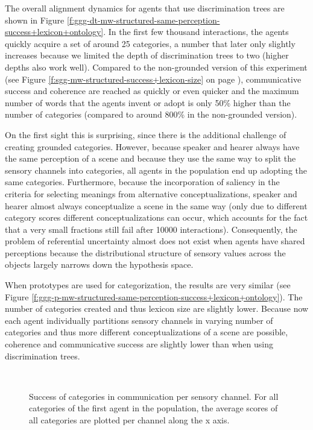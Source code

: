 The overall alignment dynamics for agents that use discrimination
trees are shown in Figure
\ref{f:ggg-dt-mw-structured-same-perception-success+lexicon+ontology}. In
the first few thousand interactions, the agents quickly acquire a set
of around 25 categories, a number that later only slightly increases
because we limited the depth of discrimination trees to two (higher
depths also work well). Compared to the non-grounded version of this
experiment (see Figure \ref{f:sgg-mw-structured-success+lexicon-size}
on page \pageref{f:sgg-mw-structured-success+lexicon-size}),
communicative success and coherence are reached as quickly or even
quicker and the maximum number of words that the agents invent or
adopt is only 50\% higher than the number of categories (compared to
around 800\% in the non-grounded version). 

On the first sight this is surprising, since there is the additional
challenge of creating grounded categories. However, because speaker
and hearer always have the same perception of a scene and because they
use the same way to split the sensory channels into categories, all
agents in the population end up adopting the same
categories. Furthermore, because the incorporation of saliency in the
criteria for selecting meanings from alternative conceptualizations,
speaker and hearer almost always conceptualize a scene in the same way
(only due to different category scores different conceptualizations
can occur, which accounts for the fact that a very small fractions
still fail after 10000 interactions). Consequently, the problem of
referential uncertainty almost does not exist when agents have shared
perceptions because the distributional structure of sensory values
across the objects largely narrows down the hypothesis space.



When prototypes are used for categorization, the results are very
similar (see Figure
\ref{f:ggg-p-mw-structured-same-perception-success+lexicon+ontology}). The
number of categories created and thus lexicon size are slightly
lower. Because now each agent individually partitions sensory channels
in varying number of categories and thus more different
conceptualizations of a scene are possible, coherence and
communicative success are slightly lower than when using
discrimination trees.


~\\

\begin{figure}[t]
  \caption{Success of categories in communication per sensory channel.
    For all categories of the first agent in the population, the
    average scores of all categories are plotted per channel along the
    x axis.}
  \label{f:ggg-dt-mw-structured-category-channel-entrenchment}
\end{figure}

